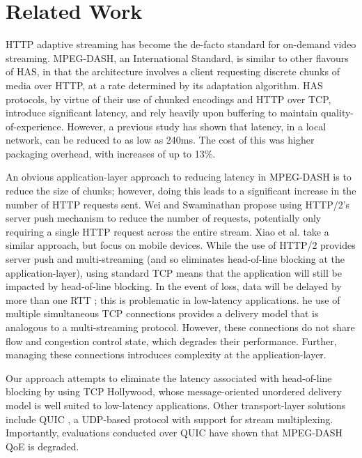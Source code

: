 \section{Related Work}
\label{sec:related}

HTTP adaptive streaming has become the de-facto standard for on-demand video streaming.
MPEG-DASH, an International Standard, is similar to other flavours of HAS, in that the
architecture involves a client requesting discrete chunks of media over HTTP, at a rate
determined by its adaptation algorithm. HAS protocols, by virtue of their use of chunked
encodings and HTTP over TCP, introduce significant latency, and rely heavily upon
buffering to maintain quality-of-experience. However, a previous study has shown that
latency, in a local network, can be reduced to as low as 240ms. The cost of this was
higher packaging overhead, with increases of up to 13\%.

An obvious application-layer approach to reducing latency in MPEG-DASH is to reduce the
size of chunks; however, doing this leads to a significant increase in the number of HTTP
requests sent. Wei and Swaminathan \cite{wei2014} propose using HTTP/2's server push
mechanism to reduce the number of requests, potentially only requiring a single HTTP
request across the entire stream. Xiao et al. \cite{xiao2016dash2m} take a similar
approach, but focus on mobile devices. While the use of HTTP/2 provides server push and
multi-streaming (and so eliminates head-of-line blocking at the application-layer), using
standard TCP means that the application will still be impacted by head-of-line blocking.
In the event of loss, data will be delayed by more than one RTT \cite{mcquistin2016tcp2};
this is problematic in low-latency applications. he use of multiple simultaneous
TCP connections provides a delivery model that is analogous to a multi-streaming protocol.
However, these connections do not share flow and congestion control state, which degrades
their performance. Further, managing these connections introduces complexity at the
application-layer.

Our approach attempts to eliminate the latency associated with head-of-line blocking by
using TCP Hollywood, whose message-oriented unordered delivery model is well suited to
low-latency applications. Other transport-layer solutions include QUIC
\cite{draft-ietf-quic-transport-latest}, a UDP-based protocol with support for stream
multiplexing. Importantly, evaluations conducted over QUIC \cite{bhat:2017:not-so-quic}
have shown that MPEG-DASH QoE is degraded. 

